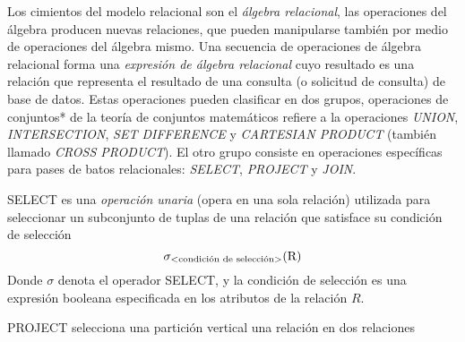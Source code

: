 Los cimientos del modelo relacional son el \emph{álgebra relacional}, las operaciones del álgebra producen nuevas relaciones, que pueden manipularse también por medio de operaciones del álgebra mismo. Una secuencia de operaciones de álgebra relacional forma una \emph{expresión de álgebra relacional} cuyo resultado es una relación que representa el resultado de una consulta (o solicitud de consulta) de base de datos. Estas operaciones pueden clasificar en dos grupos, operaciones de conjuntos* de la teoría de conjuntos matemáticos refiere a la operaciones \emph{UNION}, \emph{INTERSECTION}, \emph{SET DIFFERENCE} y \emph{CARTESIAN PRODUCT} (también llamado \emph{CROSS PRODUCT}). El otro grupo consiste en operaciones específicas para pases de batos relacionales: \emph{SELECT}, \emph{PROJECT} y \emph{JOIN}.

SELECT es una \emph{operación unaria} (opera en una sola relación) utilizada para seleccionar un subconjunto de tuplas de una relación que satisface su condición de selección
\begin{equation}
\sigma_\text{\textless condición de selección\textgreater}{\text{(R)}}
\end{equation}
Donde $\sigma$ denota el operador SELECT, y la condición de selección es una expresión booleana especificada en los atributos de la relación $R$.

PROJECT selecciona una partición vertical una relación en dos relaciones